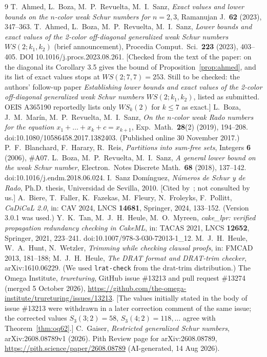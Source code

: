 \documentclass[11pt]{amsart}
\theoremstyle{definition}
\begin{document}
\begin{thebibliography}{9}
 T.~Ahmed, L.~Boza, M.~P.~Revuelta, M.~I.~Sanz, \emph{Exact values and lower bounds on the $n$-color weak Schur numbers for $n=2,3$}, Ramanujan J.\ \textbf{62} (2023), 347--363.
 T.~Ahmed, L.~Boza, M.~P.~Revuelta, M.~I.~Sanz, \emph{Lower bounds and exact values of the 2-color off-diagonal generalized weak Schur numbers $WS(2;k_1,k_2)$} (brief announcement), Procedia Comput.\ Sci.\ \textbf{223} (2023), 403--405. DOI 10.1016/j.procs.2023.08.261. [Checked from the text of the paper: on the diagonal its Corollary 3.5 gives the bound of Proposition~\ref{prop:ahmed}, and its list of exact values stops at $WS(2;7,7)=253$. Still to be checked: the authors' follow-up paper \emph{Establishing lower bounds and exact values of the 2-color off-diagonal generalized weak Schur numbers $WS(2;k_1,k_2)$}, listed as submitted. OEIS A365190 reportedly lists only $WS_k(2)$ for $k\le7$ as exact.]
 L.~Boza, J.~M.~Mar\'in, M.~P.~Revuelta, M.~I.~Sanz, \emph{On the $n$-color weak Rado numbers for the equation $x_1+\dots+x_k+c=x_{k+1}$}, Exp.\ Math.\ \textbf{28}(2) (2019), 194--208. doi:10.1080/10586458.2017.1382403. (Published online 30 November 2017.)
 P.~F.~Blanchard, F.~Harary, R.~Reis, \emph{Partitions into sum-free sets}, Integers \textbf{6} (2006), \#A07.
 L.~Boza, M.~P.~Revuelta, M.~I.~Sanz, \emph{A general lower bound on the weak Schur number}, Electron.\ Notes Discrete Math.\ \textbf{68} (2018), 137--142. doi:10.1016/j.endm.2018.06.024.
 I.~Sanz Dom\'inguez, \emph{N\'umeros de Schur y de Rado}, Ph.D. thesis, Universidad de Sevilla, 2010. [Cited by~\cite{ABRS}; not consulted by us.]
 A.~Biere, T.~Faller, K.~Fazekas, M.~Fleury, N.~Froleyks, F.~Pollitt, \emph{CaDiCaL 2.0}, in: CAV 2024, LNCS \textbf{14681}, Springer, 2024, 133--152. (Version 3.0.1 was used.)
 Y.~K.~Tan, M.~J.~H.~Heule, M.~O.~Myreen, \emph{cake\_lpr: verified propagation redundancy checking in CakeML}, in: TACAS 2021, LNCS \textbf{12652}, Springer, 2021, 223--241. doi:10.1007/978-3-030-72013-1\_12.
 M.~J.~H.~Heule, W.~A.~Hunt, N.~Wetzler, \emph{Trimming while checking clausal proofs}, in: FMCAD 2013, 181--188; M.~J.~H.~Heule, \emph{The DRAT format and DRAT-trim checker}, arXiv:1610.06229. (We used \texttt{lrat-check} from the drat-trim distribution.)
 The Omega Institute, \emph{trureturing}, GitHub issue \#13213 and pull request \#13274 (merged 5 October 2026), \url{https://github.com/the-omega-institute/trureturing/issues/13213}. [The values initially stated in the body of issue \#13213 were withdrawn in a later correction comment of the same issue; the corrected values $S_3(3;2)=58$, $S_3(4;2)=118,\dots$ agree with Theorem~\ref{thm:oq62}.]
 C.~Gaiser, \emph{Restricted generalized Schur numbers}, arXiv:2608.08789v1 (2026).
 Pith Review page for arXiv:2608.08789, \url{https://pith.science/paper/2608.08789} (AI-generated, 14 Aug 2026).
\end{thebibliography}
\end{document}
